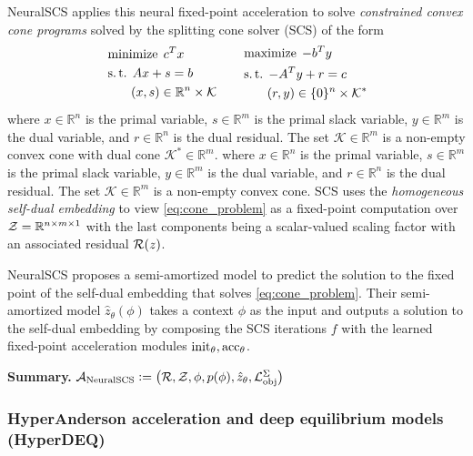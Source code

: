 \documentclass[twoside,11pt]{article}
\begin{document}
NeuralSCS \citep{venkataraman2021neural} applies this
neural fixed-point acceleration to solve
\emph{constrained convex cone programs}
solved by the splitting cone solver (SCS)
\citep{o2016conic}
of the form
\begin{equation}
  \label{eq:cone_problem}
\begin{aligned}[c]
  & \operatorname*{minimize}\; c^{T}x \\
  & \operatorname*{s.t.} \; Ax + s = b \\
  & \qquad (x,s) \in \mathbb{R}^n \times \mathcal{K}
\end{aligned}
\qquad
\begin{aligned}[c]
  & \operatorname*{maximize}\; -b^{T}y \\
  & \operatorname*{s.t.}\; -A^{T}y + r = c \\
  & \qquad (r,y) \in \{0\}^n \times \mathcal{K}^*
\end{aligned}
\end{equation}
where $x \in \mathbb{R}^n$ is the primal variable, $s \in
\mathbb{R}^m$ is the primal slack variable, $y \in \mathbb{R}^m$ is
the dual variable, and $r \in \mathbb{R}^n$ is the dual residual. The
set $\mathcal{K} \in \mathbb{R}^m$ is a non-empty convex cone with
dual cone $\mathcal{K}^* \in \mathbb{R}^m$.
where $x \in \mathbb{R}^n$ is the primal variable, $s \in
\mathbb{R}^m$ is the primal slack variable, $y \in \mathbb{R}^m$ is
the dual variable, and $r \in \mathbb{R}^n$ is the dual residual. The
set $\mathcal{K} \in \mathbb{R}^m$ is a non-empty convex cone.
SCS uses the \emph{homogeneous self-dual embedding} to view
\cref{eq:cone_problem} as a fixed-point computation
over ${\mathcal{Z}}=\mathbb{R}^{n\times m\times 1}$ with the last components being
a scalar-valued scaling factor with an associated
residual ${\mathcal{R}}(z)$.

NeuralSCS proposes a semi-amortized model to predict
the solution to the fixed point of the self-dual embedding
that solves \cref{eq:cone_problem}.
Their semi-amortized model $\hat z_\theta(\phi)$ takes
a context $\phi$ as the input and outputs a solution to the
self-dual embedding by composing the SCS iterations $f$ with
the learned fixed-point acceleration modules
${\rm init}_\theta,{\rm acc}_\theta$.

\textbf{Summary.}
${\mathcal{A}}_{\rm NeuralSCS}\vcentcolon=\left({\mathcal{R}}, {\mathcal{Z}}, \phi, p(\phi), \hat z_\theta, {\mathcal{L}}_{\rm obj}^\Sigma\right)$

\subsubsection{HyperAnderson acceleration and
  deep equilibrium models (HyperDEQ)}
\label{sec:apps:deq}
\end{document}
